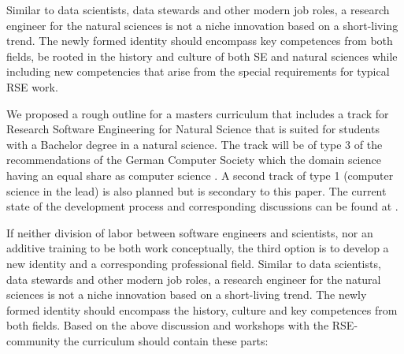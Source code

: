 \documentclass[
        twocolumn,german,biblatex
    ]{article}
\begin{document}
    Similar to data scientists, data stewards and other modern job
    roles, a research engineer for the natural sciences is not a niche
    innovation based on a short-living trend. The newly formed identity
    should encompass key competences from both fields, be rooted in the
    history and culture of both SE and natural sciences while including
    new competencies that arise from the special requirements for
    typical RSE work.

    We proposed a rough outline for a masters curriculum that includes a
    track for Research Software Engineering for Natural Science that is
    suited for students with a Bachelor degree in a natural science. The
    track will be of type 3 of the recommendations of the German
    Computer Society which the domain science having an equal share as
    computer science \autocite{zukunft2016empfehlungen}. A second track
    of type 1 (computer science in the lead) is also planned but is
    secondary to this paper. The current state of the development
    process and corresponding discussions can be found at
    \autocite{RSECurriculums2021}.

    If neither division of labor between software engineers and
    scientists, nor an additive training to be both work conceptually,
    the third option is to develop a new identity and a corresponding
    professional field. Similar to data scientists, data stewards and
    other modern job roles, a research engineer for the natural sciences
    is not a niche innovation based on a short-living trend. The newly
    formed identity should encompass the history, culture and key
    competences from both fields. Based on the above discussion and
    workshops with the RSE-community \autocite{derseev} the curriculum
    should contain these parts:
\end{document}
